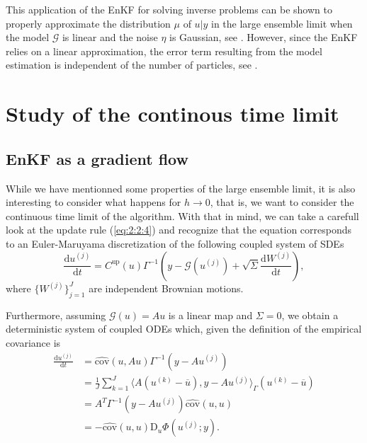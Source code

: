 \documentclass[a4paper,5p]{elsarticle}
\begin{document}
This application of the EnKF for solving inverse problems can be shown to properly approximate the
distribution $\mu$ of $u|y$ in the large ensemble limit when the model $\mathcal{G}$ is linear and
the noise $\eta$ is Gaussian, see \cite{goldstein2007bayes, law2016deterministic}. However, since the
EnKF relies on a linear approximation, the error term resulting from the model estimation is independent
of the number of particles, see \cite{ernst2015analysis}.

\section{Study of the continous time limit} \label{sec:3}
\subsection{EnKF as a gradient flow} \label{subsec:3:1}
While we have mentionned some properties of the large ensemble limit, it is also interesting to consider
what happens for $h \rightarrow 0$, that is, we want to consider the continuous time limit
of the algorithm. With that in mind, we can take a carefull look at the update rule (\ref{eq:2:2:4}) and
recognize that the equation corresponds to an Euler-Maruyama discretization of the following coupled
system of SDEs
\begin{equation} \label{eq:3:1:1}
    \frac{\text{d}u^{(j)}}{\text{d}t} = C^{\text{up}}(u)\Gamma^{-1}\left(y - \mathcal{G}(u^{(j)}) + \sqrt{\Sigma}\frac{\text{d}W^{(j)}}{\text{d}t}\right),
\end{equation}
where $\{W^{(j)}\}_{j=1}^J$ are independent Brownian motions. 

Furthermore, assuming $\mathcal{G}(u) = Au$ is a linear map and $\Sigma = 0$, we obtain a deterministic
system of coupled ODEs which, given the definition of the empirical covariance is
\begin{equation} \label{eq:3:1:2}
\begin{aligned}
    \frac{\text{d}u^{(j)}}{\text{d}t} &= \hat{\text{cov}}(u, Au)\Gamma^{-1}(y - Au^{(j)})\\
&= \frac1J\sum_{k=1}^J \langle A(u^{(k)} - \overline{u}), y - Au^{(j)}\rangle_\Gamma(u^{(k)} - \overline{u})\\
&= A^T\Gamma^{-1}(y - Au^{(j)}) \hat{\text{cov}}(u, u)\\
&= -\hat{\text{cov}}(u, u)\text{D}_u\Phi(u^{(j)}; y).
\end{aligned}
\end{equation}
\end{document}
